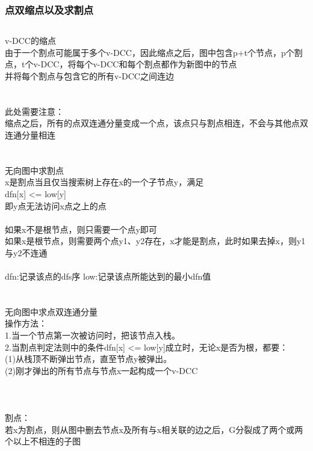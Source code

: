 \documentclass[twoside]{article}
\begin{document}
\subsubsection{点双缩点以及求割点}
\begin{lstlisting}
\end{lstlisting}
v-DCC的缩点\\
\quad 由于一个割点可能属于多个v-DCC，因此缩点之后，图中包含p+t个节点，p个割点，t个v-DCC，将每个v-DCC和每个割点都作为新图中的节点\\
\quad 并将每个割点与包含它的所有v-DCC之间连边\\
\\
\\	
此处需要注意：\\
\quad 缩点之后，所有的点双连通分量变成一个点，该点只与割点相连，不会与其他点双连通分量相连\\
\\
\\
无向图中求割点\\
x是割点当且仅当搜索树上存在x的一个子节点y，满足\\
\quad dfn[x] <= low[y]\\
\quad 即y点无法访问x点之上的点\\
\\
如果x不是根节点，则只需要一个点y即可\\
如果x是根节点，则需要两个点y1、y2存在，x才能是割点，此时如果去掉x，则y1与y2不连通\\
\\
dfn:记录该点的dfs序	 \quad low:记录该点所能达到的最小dfn值\\
\\
\\
无向图中求点双连通分量\\
操作方法：\\
\quad 1.当一个节点第一次被访问时，把该节点入栈。\\
\quad 2.当割点判定法则中的条件dfn[x] <= low[y]成立时，无论x是否为根，都要：\\
\quad\quad (1)从栈顶不断弹出节点，直至节点y被弹出。\\
\quad\quad (2)刚才弹出的所有节点与节点x一起构成一个v-DCC\\
\\
\\
\\
割点：\\
\quad 若x为割点，则从图中删去节点x及所有与x相关联的边之后，G分裂成了两个或两个以上不相连的子图\\
\\
\end{document}
